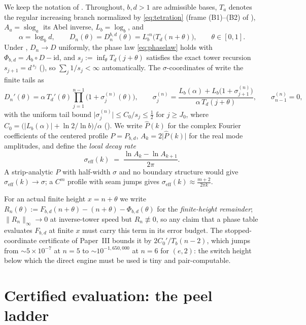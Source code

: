\documentclass[11pt,a4paper]{article}
\theoremstyle{definition}
\theoremstyle{remark}
\newcommand{\slog}{\operatorname{slog}}
\newcommand{\eff}{\mathrm{eff}}
\begin{document}
We keep the notation of \cite{phaselaw,unified}. Throughout, $b,d>1$ are admissible bases,
$T_a$ denotes the regular increasing branch normalized by \eqref{eq:tetration} (frame
(B1)--(B2) of \cite{unified}), $A_a=\slog_a$ its Abel inverse, $L_b=\log_b$, and
\[
\alpha=\log_b d,\qquad
D_n(\theta)=D^{b,d}_n(\theta)=L_b^{\circ n}\bigl(T_d(n+\theta)\bigr),\qquad
\theta\in[0,1].
\]
Under \cite[Hyp.~2.2, 2.4]{phaselaw}, $D_n\to D$ uniformly, the phase law
\eqref{eq:phaselaw} holds with $\Phi_{b,d}=A_b\circ D-\mathrm{id}$, and
$s_j:=\inf_{\theta}T_d(j+\theta)$ satisfies the exact tower recursion $s_{j+1}=d^{\,s_j}$
(\cite[Lem.~2.5]{unified}), so $\sum_j 1/s_j<\infty$ automatically. The $\sigma$-coordinates
of \cite[Lem.~6.1, 6.3]{unified} write the finite tails as
\begin{equation}\label{eq:sigmarec}
D_n'(\theta)=\alpha\,T_d'(\theta)\prod_{j=1}^{n-1}\bigl(1+\sigma^{(n)}_j(\theta)\bigr),
\qquad
\sigma^{(n)}_j=\frac{L_b(\alpha)+L_b\bigl(1+\sigma^{(n)}_{j+1}\bigr)}{\alpha\,T_d(j+\theta)},
\qquad \sigma^{(n)}_{n-1}=0,
\end{equation}
with the uniform tail bound $\lvert\sigma^{(n)}_j\rvert\le C_0/s_j\le\tfrac12$ for
$j\ge J_0$, where $C_0=\bigl(\lvert L_b(\alpha)\rvert+\ln 2/\ln b\bigr)/\alpha$
(\cite[Eq.~(17)]{unified}). We write $\widehat P(k)$ for the complex Fourier coefficients of
the centered profile $P=P_{b,d}$, $A_k=2\lvert\widehat P(k)\rvert$ for the real mode
amplitudes, and define the \emph{local decay rate}
\begin{equation}\label{eq:sigmaeff}
\sigma_\eff(k)\;=\;\frac{\ln A_k-\ln A_{k+1}}{2\pi}.
\end{equation}
A strip-analytic $P$ with half-width $\sigma$ and no boundary structure would give
$\sigma_\eff(k)\to\sigma$; a $C^m$ profile with seam jumps gives
$\sigma_\eff(k)\approx\frac{m+2}{2\pi k}$.

For an actual finite height $x=n+\theta$ we write
$R_n(\theta):=F_{b,d}(n+\theta)-(n+\theta)-\Phi_{b,d}(\theta)$ for the
\emph{finite-height remainder}; $\lVert R_n\rVert_\infty\to0$ at inverse-tower speed but
$R_n\not\equiv0$, so any claim that a phase table evaluates $F_{b,d}$ at finite $x$ must
carry this term in its error budget. The stopped-coordinate certificate of Paper~III
\cite{paperIII} bounds it by $2C_0'/T_b(n-2)$, which jumps from $\sim5\times10^{-7}$ at
$n=5$ to $\sim10^{-1{,}650{,}000}$ at $n=6$ for $(e,2)$: the switch height below which the
direct engine must be used is tiny and pair-computable.

\section{Certified evaluation: the peel ladder}\label{sec:ladder}
\end{document}
